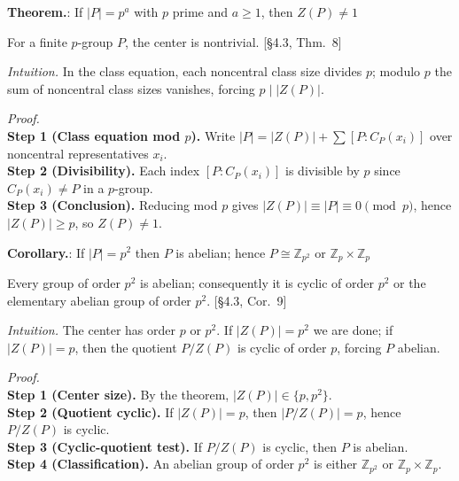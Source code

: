 \documentclass[12pt]{article}
\theoremstyle{definition}
\begin{document}
\newpage


\noindent\textbf{Theorem.}: If $|P|=p^a$ with $p$ prime and $a\ge 1$, then $Z(P)\neq 1$

\newpage

For a finite $p$-group $P$, the center is nontrivial. \hfill {\footnotesize [§4.3, Thm.~8]}\\

\dotfill

\emph{Intuition.} In the class equation, each noncentral class size divides $p$; modulo $p$ the sum of noncentral class sizes vanishes, forcing $p\mid |Z(P)|$.

\dotfill

\emph{Proof.}\\
\textbf{Step 1 (Class equation mod $p$).} Write $|P|=|Z(P)|+\sum [P:C_P(x_i)]$ over noncentral representatives $x_i$.\\
\textbf{Step 2 (Divisibility).} Each index $[P:C_P(x_i)]$ is divisible by $p$ since $C_P(x_i)\neq P$ in a $p$-group.\\
\textbf{Step 3 (Conclusion).} Reducing mod $p$ gives $|Z(P)|\equiv |P|\equiv 0\pmod p$, hence $|Z(P)|\ge p$, so $Z(P)\ne 1$.\\

\newpage


\noindent\textbf{Corollary.}: If $|P|=p^2$ then $P$ is abelian; hence $P\cong \mathbb{Z}_{p^2}$ or $\mathbb{Z}_p\times \mathbb{Z}_p$

\newpage

Every group of order $p^2$ is abelian; consequently it is cyclic of order $p^2$ or the elementary abelian group of order $p^2$. \hfill {\footnotesize [§4.3, Cor.~9]}\\

\dotfill

\emph{Intuition.} The center has order $p$ or $p^2$. If $|Z(P)|=p^2$ we are done; if $|Z(P)|=p$, then the quotient $P/Z(P)$ is cyclic of order $p$, forcing $P$ abelian.

\dotfill

\emph{Proof.}\\
\textbf{Step 1 (Center size).} By the theorem, $|Z(P)|\in\{p,p^2\}$.\\
\textbf{Step 2 (Quotient cyclic).} If $|Z(P)|=p$, then $|P/Z(P)|=p$, hence $P/Z(P)$ is cyclic.\\
\textbf{Step 3 (Cyclic-quotient test).} If $P/Z(P)$ is cyclic, then $P$ is abelian.\\
\textbf{Step 4 (Classification).} An abelian group of order $p^2$ is either $\mathbb{Z}_{p^2}$ or $\mathbb{Z}_p\times\mathbb{Z}_p$.\\
\end{document}
